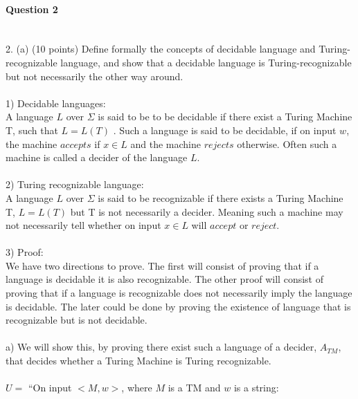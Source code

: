\documentclass{report}
\newcommand{\me}[1]{
\begin{math}
#1
\end{math}
}
\begin{document}
\paragraph{\Large{Question 2\\ \\}}
2. (a) (10 points) Define formally the concepts of decidable language and Turing-recognizable language, and show that a decidable language is Turing-recognizable but not necessarily the other way around.  \\  \\
1) Decidable languages:\\  A language $L$ over $\Sigma$ is said to be to be decidable if there exist a Turing Machine T, such that \me{L = L(T) }. Such a language is said to be decidable, if on input $w$, the machine $accepts$ if $x \in L$ and the machine $rejects$ otherwise.  Often such a machine is called a decider of the language $L$.  \\ \\
2) Turing recognizable language: \\A language $L$ over $\Sigma$ is said to be recognizable 	if there exists a Turing Machine T, \me{L =L(T)} but T is not necessarily a decider. Meaning such a machine may not necessarily tell whether on input $x \in L$ will $accept$ or 
$reject$. \\ \\3) Proof: \\ We have two directions to prove. The first will consist of proving that if a language is decidable it is also recognizable. The other proof will consist of proving that if a language is recognizable does not necessarily imply the language is decidable. The later could be done by proving the existence of language that is recognizable but is not decidable. \\ \\
a) We will show this, by proving there exist such a language of a decider, $A_{TM}$, that decides whether a Turing Machine is Turing recognizable. \\ \\
$U =$  ``On  input $<M,w>$, where $M$ is a TM and $w$ is a string: \\
\end{document}
